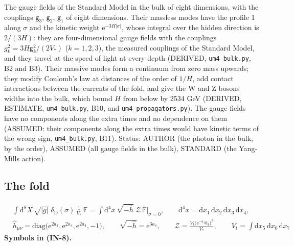 \documentclass[
  10pt,
]{article}
\begin{document}
The gauge fields of the Standard Model in the bulk of eight dimensions,
with the couplings \(\mathsf{g}_3\), \(\mathsf{g}_2\), \(\mathsf{g}_1\)
of eight dimensions. Their massless modes have the profile 1 along
\(\sigma\) and the kinetic weight
\(\mathrm{e}^{-3H\lvert\sigma\rvert}\), whose integral over the hidden
direction is \(2/(3H)\): they are four-dimensional gauge fields with the
couplings \(g_k^2 = 3H\mathsf{g}_k^2/(2V_*)\) (\(k = 1, 2, 3\)), the
measured couplings of the Standard Model, and they travel at the speed
of light at every depth (DERIVED, \texttt{um4\_bulk.py}, B2 and B3).
Their massive modes form a continuum from zero mass upwards; they modify
Coulomb's law at distances of the order of \(1/H\), add contact
interactions between the currents of the fold, and give the W and Z
bosons widths into the bulk, which bound \(H\) from below by 2534 GeV
(DERIVED, ESTIMATE, \texttt{um4\_bulk.py}, B10, and
\texttt{um4\_propagators.py}). The gauge fields have no components along
the extra times and no dependence on them (ASSUMED: their components
along the extra times would have kinetic terms of the wrong sign,
\texttt{um4\_bulk.py}, B11). Status: AUTHOR (the photon in the bulk, by
the order), ASSUMED (all gauge fields in the bulk), STANDARD (the
Yang-Mills action).

\hypertarget{the-fold}{%
\subsection{The fold}\label{the-fold}}

\[
\begin{aligned}
&\int\mathrm{d}^8X\,\sqrt{\lvert g\rvert}\;\delta_{\mathrm{D}}(\sigma)\,\frac{1}{V_*}\,\mathbb{F}
 = \int\mathrm{d}^4x\,\sqrt{-\hat h}\;\mathcal{Z}\,\mathbb{F}\big\vert_{\sigma=0},\qquad \mathrm{d}^4x = \mathrm{d}x_1\,\mathrm{d}x_2\,\mathrm{d}x_3\,\mathrm{d}x_4,\\
&\hat h_{\mu\nu} = \mathrm{diag}\big(\mathrm{e}^{2a_4}, \mathrm{e}^{2a_4}, \mathrm{e}^{2a_4}, -1\big),\qquad
 \sqrt{-\hat h} = \mathrm{e}^{3a_4},\qquad
 \mathcal{Z} = \frac{V_{\mathrm{t}}\big(\mathrm{e}^{-a_4}b_4\big)^3}{V_*},\qquad V_{\mathrm{t}} = \int\mathrm{d}x_5\,\mathrm{d}x_6\,\mathrm{d}x_7
\end{aligned} \tag{IN-8}
\] \textbf{Symbols in (IN-8).}
\end{document}
